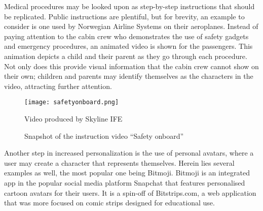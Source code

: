 Medical procedures may be looked upon as step-by-step instructions that should be replicated. Public instructions are plentiful, but for brevity, an example to consider is one used by Norwegian Airline Systems on their aeroplanes. Instead of paying attention to the cabin crew who demonstrates the use of safety gadgets and emergency procedures, an animated video \autocite{norwegianairshuttle2012} is shown for the passengers. This animation depicts a child and their parent as they go through each procedure. Not only does this provide visual information that the cabin crew cannot show on their own; children and parents may identify themselves as the characters in the video, attracting further attention.

\begin{figure}
    \centering
    \texttt{[image: safetyonboard.png]}
    \caption{Snapshot of the instruction video \enquote{Safety onboard}}
    Video produced by Skyline IFE
    \label{fig:safetyonboard}
\end{figure}

Another step in increased personalization is the use of personal avatars, where a user may create a character that represents themselves. Herein lies several examples as well, the most popular one being Bitmoji. Bitmoji is an integrated app in the popular social media platform Snapchat that features personalised cartoon avatars for their users. It is a spin-off of Bitstrips.com, a web application that was more focused on comic strips designed for educational use. %
